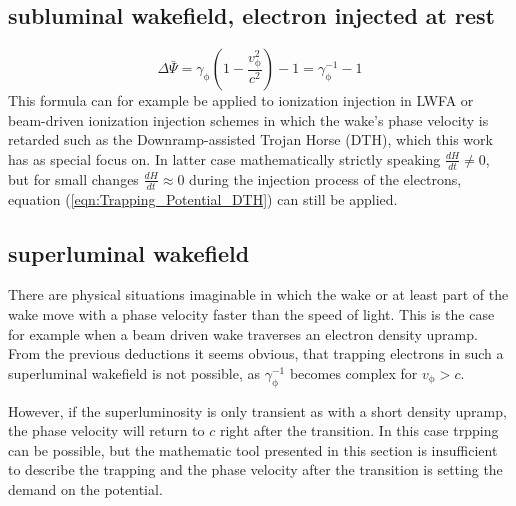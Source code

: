 \subsection*{subluminal wakefield, electron injected at rest}

\begin{equation}
\label{eqn:Trapping_Potential_DTH}
\Delta \bar{\Psi}=\gamma_\mathrm{\phi}(1-\frac{v_\mathrm{\phi}^2}{c^2})-1=\gamma_\mathrm{\phi}^{-1}-1
\end{equation}
This formula can for example be applied to ionization injection in LWFA\cite{PakPRL2012} or beam-driven ionization injection schemes in which the wake's phase velocity is retarded such as the Downramp-assisted Trojan Horse (DTH)\cite{DTH}, which this work has as special focus on. In latter case mathematically strictly speaking $\frac{d H}{dt}\neq0 $, but for small changes $\frac{dH}{dt}\approx 0$ during the injection process of the electrons, equation (\ref{eqn:Trapping_Potential_DTH}) can still be applied.

\subsection*{superluminal wakefield}
There are physical situations imaginable in which the wake or at least part of the wake move with a phase velocity faster than the speed of light. This is the case for example when a beam driven wake traverses an electron density upramp.
From the previous deductions it seems obvious, that trapping electrons in such a superluminal wakefield is not possible, as $\gamma_\mathrm{\phi}^{-1}$ becomes complex for $v_\mathrm{\phi}>c$.

However, if the superluminosity is only transient as with a short density upramp, the phase velocity will return to $c$ right after the transition. In this case trpping can be possible, but the mathematic tool presented in this section is insufficient to describe the trapping and the phase velocity after the transition is setting the demand on the potential.

